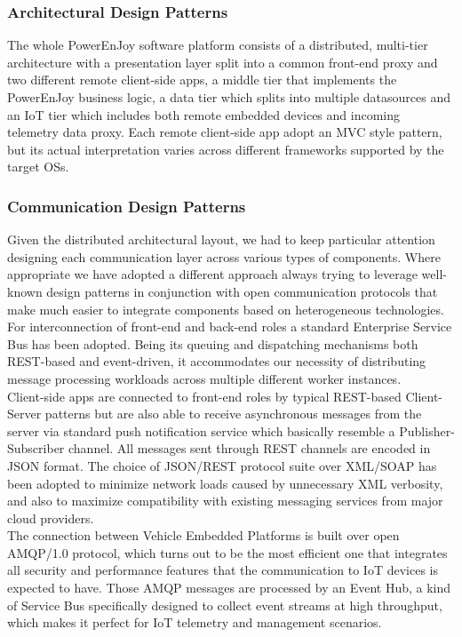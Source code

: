 \subsubsection{Architectural Design Patterns}
The whole PowerEnJoy software platform consists of a distributed, multi-tier architecture with a presentation layer split into a common front-end proxy and two different remote client-side apps, a middle tier that implements the PowerEnJoy business logic, a data tier which splits into multiple datasources and an IoT tier which includes both remote embedded devices and incoming telemetry data proxy. Each remote client-side app adopt an MVC style pattern, but its actual interpretation varies across different frameworks supported by the target OSs.

\subsubsection{Communication Design Patterns}
\label{com_patterns}
Given the distributed architectural layout, we had to keep particular attention designing each communication layer across various types of components. Where appropriate we have adopted a different approach always trying to leverage well-known design patterns in conjunction with open communication protocols that make much easier to integrate components based on heterogeneous technologies.\\

For interconnection of front-end and back-end roles a standard Enterprise Service Bus has been adopted. Being its queuing and dispatching mechanisms both REST-based and event-driven, it accommodates our necessity of distributing message processing workloads across multiple different worker instances.\\

Client-side apps are connected to front-end roles by typical REST-based Client-Server patterns but are also able to receive asynchronous messages from the server via standard push notification service which basically resemble a Publisher-Subscriber channel. All messages sent through REST channels are encoded in JSON format. The choice of JSON/REST protocol suite over XML/SOAP has been adopted to minimize network loads caused by unnecessary XML verbosity, and also to maximize compatibility with existing messaging services from major cloud providers.\\

The connection between Vehicle Embedded Platforms is built over open AMQP/1.0 protocol, which turns out to be the most efficient one that integrates all security and performance features that the communication to IoT devices is expected to have. Those AMQP messages are processed by an Event Hub, a kind of Service Bus specifically designed to collect event streams at high throughput, which makes it perfect for IoT telemetry and management scenarios.

